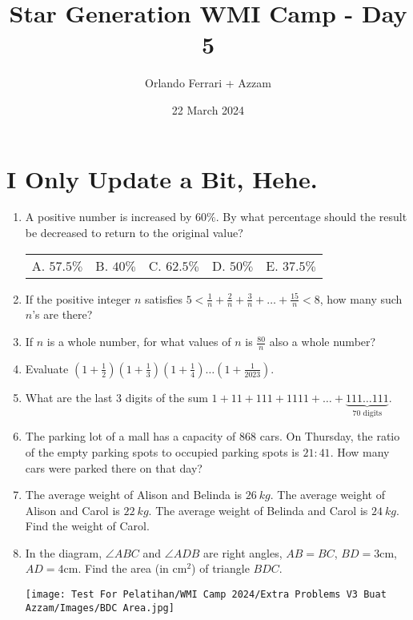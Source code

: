 \documentclass[11pt]{scrartcl}
\begin{document}
		\title{Star Generation WMI Camp - Day 5}
	\author{Orlando Ferrari + Azzam}
	\date{22 March 2024}
	
	
	\section{I Only Update a Bit, Hehe.}
	\begin{enumerate}		
		
		\item A positive number is increased by $60\%$. By what percentage should the result be decreased to return to the original value?
		
		\begin{tabular}{p{2.8cm} p{2.8cm} p{2.8cm} p{2.8cm} p{2.8cm}}
			A. $57.5\%$ & B. $40\%$ & C. $62.5\%$ & D. $50\%$ & E. $37.5\%$
		\end{tabular}
		
		\item If the positive integer $n$ satisfies $5 < \frac{1}{n}+\frac{2}{n}+\frac{3}{n}+\ldots+\frac{15}{n}<8$, how many such $n$'s are there?
		
		\item If $n$ is a whole number, for what values of $n$ is $\frac{80}{n}$ also a whole number?
		
		\item Evaluate $\left(1+\frac{1}{2}\right)\left(1+\frac{1}{3}\right)\left(1+\frac{1}{4}\right)\ldots\left(1+\frac{1}{2023}\right)$.
		
		\item What are the last 3 digits of the sum $1 + 11 + 111 + 1111 + \ldots + \underbrace{111\ldots111}_{70 \text{ digits}}$.
		
		\item The parking lot of a mall has a capacity of $868$ cars. On Thursday, the ratio of the empty parking spots to occupied parking spots is $21 : 41$. How many cars were parked there on that day?
		
		\item The average weight of Alison and Belinda is $26 \ kg$. The average weight of Alison and Carol is $22 \ kg$. The average weight of Belinda and Carol is $24 \ kg$. Find the weight of Carol.
		
		\item In the diagram, $\angle ABC$ and $\angle ADB$ are right angles, $AB = BC$, $BD = 3 \mathrm{cm}$, $AD = 4\mathrm{cm}$. Find the area (in $\mathrm{cm}^2$) of triangle $BDC$.
		\begin{figure*}[h!]
			\centering
			\texttt{[image: Test For Pelatihan/WMI Camp 2024/Extra Problems V3 Buat Azzam/Images/BDC Area.jpg]}
		\end{figure*}
		

\end{enumerate}
\end{document}
